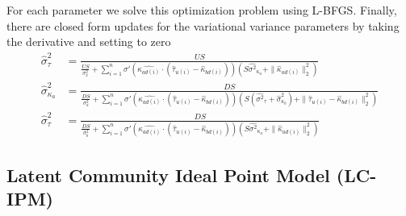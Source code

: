 \documentclass{article}
\begin{document}
For each parameter we solve this optimization problem using L-BFGS. Finally, there are closed form updates for the variational variance parameters by taking the derivative and setting to zero
\begin{align*}
\hat{\sigma}^2_\tau & = \frac{US}{\frac{US}{\sigma^2_x} + \sum_{i=1}^n \sigma'(\hat{\kappa_{ad(i)}} \cdot (\hat{\tau}_{u(i)} - \hat{\kappa}_{bd(i)}))(S\hat{\sigma^2}_{\kappa_a} + \|\hat{\kappa}_{ad(i)}\|_2^2)}\\
\hat{\sigma}^2_{\kappa_a} & = \frac{DS}{\frac{DS}{\sigma^2_a} + \sum_{i=1}^n \sigma'(\hat{\kappa_{ad(i)}} \cdot (\hat{\tau}_{u(i)} - \hat{\kappa}_{bd(i)}))(S(\hat{\sigma^2}_{\tau} + \hat{\sigma}^2_{\kappa_b}) + \|\hat{\tau}_{u(i)} - \hat{\kappa}_{bd(i)}\|_2^2)}\\
\hat{\sigma}^2_\tau & = \frac{DS}{\frac{DS}{\sigma^2_b} + \sum_{i=1}^n \sigma'(\hat{\kappa_{ad(i)}} \cdot (\hat{\tau}_{u(i)} - \hat{\kappa}_{bd(i)}))(S\hat{\sigma^2}_{\kappa_a} + \|\hat{\kappa}_{ad(i)}\|_2^2)}
\end{align*}


\subsection{Latent Community Ideal Point Model (LC-IPM)}
\label{lcipmvi}
\end{document}
